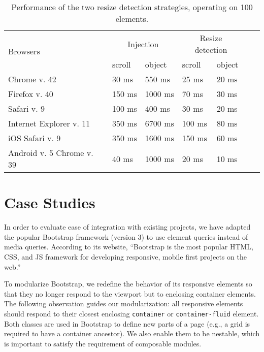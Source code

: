\documentclass[sigconf,9pt]{acmart}
\newcommand{\code}[1]{\texttt{#1}}
\begin{document}
    \begin{table}[ht]\center
      \small
      \begin{tabular}[t]{ l l l l l l l }
        \multirow{2}{*}{Browsers} & \multicolumn{2}{c}{Injection} & \multicolumn{2}{c}{Resize detection} \\
        & scroll & object & scroll & object \\
        \hline
        Chrome v. 42                & 30 ms   & 550 ms    & 25 ms    & 20 ms  \\
        Firefox v. 40               & 150 ms  & 1000 ms   & 70 ms    & 30 ms  \\
        Safari v. 9                 & 100 ms  & 400 ms    & 30 ms    & 20 ms  \\
        Internet Explorer v. 11     & 350 ms  & 6700 ms   & 100 ms   & 80 ms  \\
        iOS Safari v. 9             & 350 ms  & 1600 ms   & 150 ms   & 60 ms  \\
        Android v. 5 Chrome v. 39   & 40 ms   & 1000 ms  & 20 ms     & 10 ms  \\
      \end{tabular}
      \vspace{.5cm}
      \caption{Performance of the two resize detection strategies, operating on 100 elements.}
      \label{table:erd-layout-engines}
    \end{table}

\section{Case Studies}\label{sec:case-studies}
    In order to evaluate ease of integration with existing projects, we have adapted the popular Bootstrap framework (version 3) to use element queries instead of media queries.
    According to its website, ``Bootstrap is the most popular HTML, CSS, and JS framework for developing responsive, mobile first projects on the web.''~\cite{bootstrap}

    To modularize Bootstrap, we redefine the behavior of its responsive elements so that they no longer respond to the viewport but to enclosing container elements.
    The following observation guides our modularization: all responsive elements should respond to their closest enclosing \code{container} or \code{container-fluid} element.
    Both classes are used in Bootstrap to define new parts of a page (e.g., a grid is required to have a container ancestor).
    We also enable them to be nestable, which is important to satisfy the requirement of composable modules.
\end{document}
